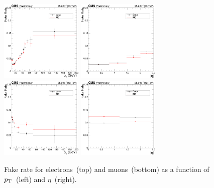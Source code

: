 \begin{figure}[htbp]
  \begin{center}
    \includegraphics[width=0.35\textwidth]{methods/eFakeRate_pt.png}
    \includegraphics[width=0.35\textwidth]{methods/eFakeRate_eta.png} \\
    \includegraphics[width=0.35\textwidth]{methods/mFakeRate_pt.png}
    \includegraphics[width=0.35\textwidth]{methods/mFakeRate_eta.png}
    \caption[Misidentification rates for electrons and muons]{
      Fake rate for electrons~(top) and muons~(bottom) as a function of $p_\mathrm{T}$~(left) and $\eta$~(right).
      }\label{fig:fakerates}
  \end{center}
\end{figure}

